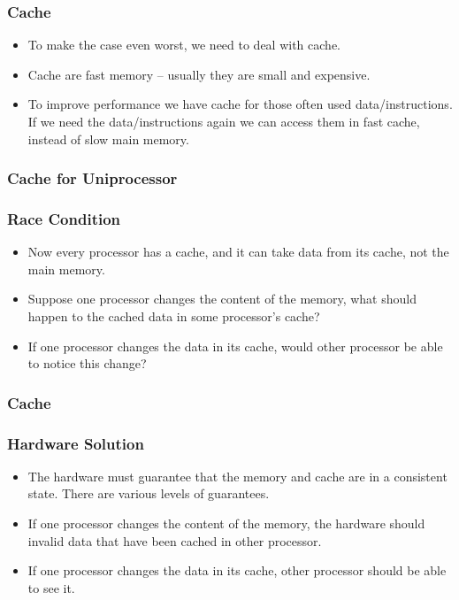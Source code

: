 \documentclass{beamer}
\begin{document}
\begin{CJK}{UTF8}{bsmi}
\begin{frame}
\frametitle{Cache}
\begin{itemize}
\item To make the case even worst, we need to deal with cache.
\item Cache are fast memory -- usually they are small and expensive.
\item To improve performance we have cache for those often used
  data/instructions.  If we need the data/instructions again we can
  access them in fast cache, instead of slow main memory.
\end{itemize}
\end{frame}

\begin{frame}
\frametitle{Cache for Uniprocessor}
\centerline{}
\end{frame}

\begin{frame}
\frametitle{Race Condition}
\begin{itemize}
\item Now every processor has a cache, and it can take data from its
  cache, not the main memory.
\item Suppose one processor changes the content of the memory, what
  should happen to the cached data in some processor's cache?
\item If one processor changes the data in its cache, would other
  processor be able to notice this change?
\end{itemize}
\end{frame}

\begin{frame}
\frametitle{Cache}
\centerline{}
\end{frame}

\begin{frame}
\frametitle{Hardware Solution}
\begin{itemize}
\item The hardware must guarantee that the memory and cache are in a
  consistent state.  There are various levels of guarantees.
\item If one processor changes the content of the memory, the hardware
  should invalid data that have been cached in other processor.
\item If one processor changes the data in its cache, other processor
  should be able to see it.
\end{itemize}
\end{frame}


\end{CJK}
\end{document}
